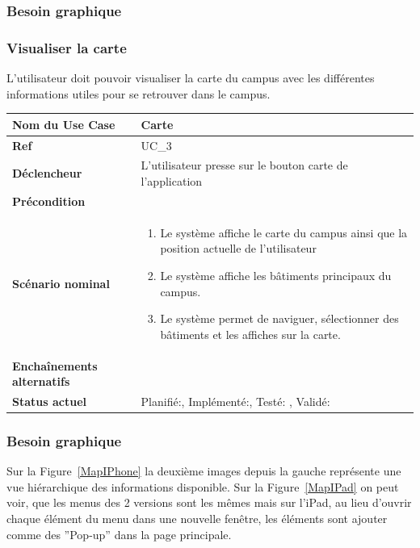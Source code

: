 		\subsubsection*{Besoin graphique}


		\subsubsection{Visualiser la carte}
					L'utilisateur doit pouvoir visualiser la carte du campus avec les différentes informations utiles pour se retrouver dans le campus.\\[0.2cm]
					\begin{longtable}{|l|p{10cm}|}
						\hline \textbf{Nom du Use Case} & Carte \\ 
						\hline \textbf{Ref} & UC\_3  \\ 
						\hline \textbf{Déclencheur} & L'utilisateur presse sur le bouton carte de l'application \\
						\hline \textbf{Précondition} &  \\
						\hline \textbf{Scénario nominal} & 
						\begin{enumerate}
							\item Le système affiche le carte du campus ainsi que la position actuelle de l'utilisateur
							\item Le système affiche les bâtiments principaux du campus.
							\item Le système permet de naviguer, sélectionner des bâtiments  et les affiches sur la carte.
						\end{enumerate}
						\\ 
						\hline \textbf{Enchaînements alternatifs} & \\
						\hline \textbf{Status actuel} & Planifié:\CheckedBox , Implémenté:\CheckedBox  , Testé: \CheckedBox  , Validé: \CheckedBox  \\
						\hline 
					\end{longtable} 
			\subsubsection*{Besoin graphique}
					Sur la Figure~\ref{MapIPhone} la deuxième images depuis la gauche représente une vue hiérarchique des informations disponible.
					Sur la Figure~\ref{MapIPad} on peut voir, que les menus des 2 versions sont les mêmes mais sur l'iPad, au lieu d'ouvrir chaque élément du menu dans une nouvelle fenêtre, les éléments sont ajouter comme des ''Pop-up'' dans la page principale.
			
